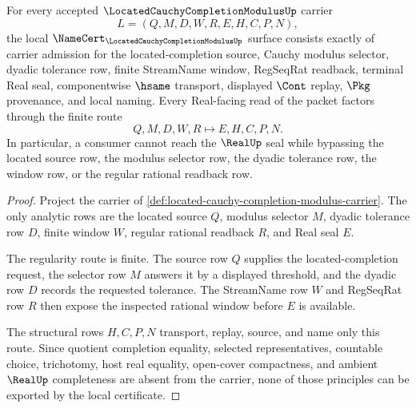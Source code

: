 \begin{theorem}
\label{thm:located-cauchy-completion-modulus-regularity}
For every accepted $\LocatedCauchyCompletionModulusUp$ carrier
$$
L=(Q,M,D,W,R,E,H,C,P,N),
$$
the local $\NameCert_{\LocatedCauchyCompletionModulusUp}$ surface consists exactly of carrier admission for the located-completion source, Cauchy modulus selector, dyadic tolerance row, finite StreamName window, RegSeqRat readback, terminal Real seal, componentwise $\hsame$ transport, displayed $\Cont$ replay, $\Pkg$ provenance, and local naming. Every Real-facing read of the packet factors through the finite route
$$
Q,M,D,W,R \longmapsto E,H,C,P,N .
$$
In particular, a consumer cannot reach the $\RealUp$ seal while bypassing the located source row, the modulus selector row, the dyadic tolerance row, the window row, or the regular rational readback row.
\end{theorem}
\begin{proof}
Project the carrier of \autoref{def:located-cauchy-completion-modulus-carrier}. The only analytic rows are the located source $Q$, modulus selector $M$, dyadic tolerance row $D$, finite window $W$, regular rational readback $R$, and Real seal $E$.

The regularity route is finite. The source row $Q$ supplies the located-completion request, the selector row $M$ answers it by a displayed threshold, and the dyadic row $D$ records the requested tolerance. The StreamName row $W$ and RegSeqRat row $R$ then expose the inspected rational window before $E$ is available.

The structural rows $H,C,P,N$ transport, replay, source, and name only this route. Since quotient completion equality, selected representatives, countable choice, trichotomy, host real equality, open-cover compactness, and ambient $\RealUp$ completeness are absent from the carrier, none of those principles can be exported by the local certificate.
\end{proof}



